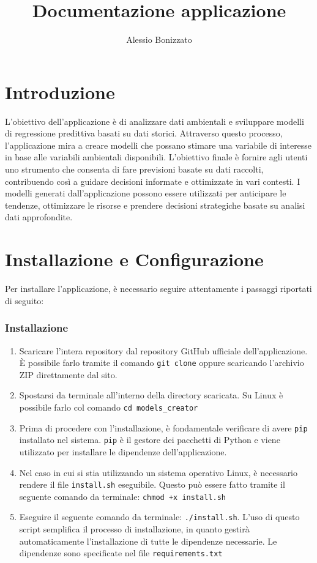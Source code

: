 \documentclass[a4paper,10pt]{article}
\newcommand{\rootDirectory}{models\_creator}
\begin{document}
\title{Documentazione applicazione}
\author{Alessio Bonizzato}
\date{}
\maketitle %

\newpage

\section{Introduzione}
L'obiettivo dell'applicazione è di analizzare dati ambientali e sviluppare modelli di regressione predittiva basati su dati storici. 
Attraverso questo processo, l'applicazione mira a creare modelli che possano stimare una variabile di interesse in base alle variabili ambientali disponibili. 
L'obiettivo finale è fornire agli utenti uno strumento che consenta di fare previsioni basate su dati raccolti, contribuendo così a guidare decisioni informate 
e ottimizzate in vari contesti. I modelli generati dall'applicazione possono essere utilizzati per anticipare le tendenze, 
ottimizzare le risorse e prendere decisioni strategiche basate su analisi dati approfondite.

\section{Installazione e Configurazione}
Per installare l'applicazione, è necessario seguire attentamente i passaggi riportati di seguito:

\subsubsection*{Installazione}
\begin{enumerate}
  \item Scaricare l'intera repository dal repository GitHub ufficiale dell'applicazione. 
  È possibile farlo tramite il comando \texttt{git clone} oppure scaricando l'archivio ZIP direttamente dal sito.
  \item Spostarsi da terminale all'interno della directory scaricata. Su Linux è possibile farlo col comando \texttt{cd \rootDirectory}
  \item Prima di procedere con l'installazione, è fondamentale verificare di avere \texttt{pip} installato nel sistema. 
  \texttt{pip} è il gestore dei pacchetti di Python e viene utilizzato per installare le dipendenze dell'applicazione.
  \item Nel caso in cui si stia utilizzando un sistema operativo Linux, è necessario rendere il file \texttt{install.sh} eseguibile. 
  Questo può essere fatto tramite il seguente comando da terminale: \texttt{chmod +x install.sh}
  \item Eseguire il seguente comando da terminale: \texttt{./install.sh}. L'uso di questo script semplifica il processo di installazione, 
  in quanto gestirà automaticamente l'installazione di tutte le dipendenze necessarie. Le dipendenze sono specificate nel file \texttt{requirements.txt}
\end{enumerate}
\end{document}
